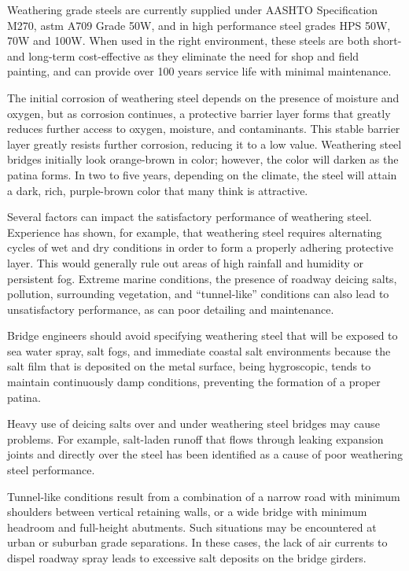 Weathering grade steels are currently supplied under AASHTO Specification M270, \acrshort*{astm} A709 Grade 50W,
and in high performance steel grades HPS 50W, 70W and 100W. When used in the right environment, these steels
are both short- and long-term cost-effective as they eliminate the need for shop and field painting, and can provide
over 100 years service life with minimal maintenance.

The initial corrosion of weathering steel depends on the presence of moisture and oxygen, but as corrosion
continues, a protective barrier layer forms that greatly reduces further access to oxygen, moisture, and contaminants.
This stable barrier layer greatly resists further corrosion, reducing it to a low value. Weathering steel bridges initially
look orange-brown in color; however, the color will darken as the patina forms. In two to five years, depending on
the climate, the steel will attain a dark, rich, purple-brown color that many think is attractive.

Several factors can impact the satisfactory performance of weathering steel. Experience has shown, for example,
that weathering steel requires alternating cycles of wet and dry conditions in order to form a properly adhering
protective layer. This would generally rule out areas of high rainfall and humidity or persistent fog. Extreme marine
conditions, the presence of roadway deicing salts, pollution, surrounding vegetation, and “tunnel-like” conditions can
also lead to unsatisfactory performance, as can poor detailing and maintenance.

Bridge engineers should avoid specifying weathering steel that will be exposed to sea water spray, salt fogs, and
immediate coastal salt environments because the salt film that is deposited on the metal surface, being hygroscopic,
tends to maintain continuously damp conditions, preventing the formation of a proper patina.

Heavy use of deicing salts over and under weathering steel bridges may cause problems. For example, salt-laden
runoff that flows through leaking expansion joints and directly over the steel has been identified as a cause of poor
weathering steel performance.

Tunnel-like conditions result from a combination of a narrow road with minimum shoulders between vertical
retaining walls, or a wide bridge with minimum headroom and full-height abutments. Such situations may be
encountered at urban or suburban grade separations. In these cases, the lack of air currents to dispel roadway spray
leads to excessive salt deposits on the bridge girders.

